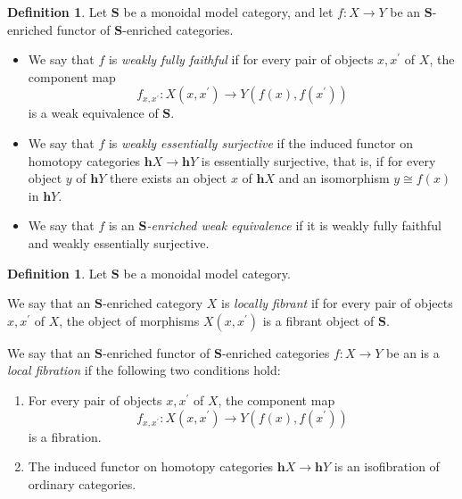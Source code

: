 \documentclass[a4paper]{article}
\numberwithin{equation}{subsection}
\theoremstyle{plain}   %
\theoremstyle{definition}
\newtheorem{defn}[equation]{Definition}
\theoremstyle{remark}
\theoremstyle{plain}
\begin{document}
\begin{defn}
	Let \(\mathbf{S}\) be a monoidal model category, and let \(f:X\to Y\) be an \(\mathbf{S}\)-enriched functor of \(\mathbf{S}\)-enriched categories.  
	
	\begin{itemize}
		\item We say that \(f\) is \emph{weakly fully faithful} if for every pair of objects \(x,x^\prime\) of \(X\), the component map 
		\[
			f_{x,x^\prime}: X(x,x^\prime) \to Y(f(x),f(x^\prime))
		\]
		is a weak equivalence of \(\mathbf{S}\).
		\item We say that \(f\) is \emph{weakly essentially surjective} if the induced functor on homotopy categories \(\mathbf{h}X\to \mathbf{h}Y\) is essentially surjective, that is, if for every object \(y\) of \(\mathbf{h}Y\) there exists an object \(x\) of \(\mathbf{h}X\) and an isomorphism \(y\cong f(x)\) in \(\mathbf{h}Y\).
		\item We say that \(f\) is an \emph{\(\mathbf{S}\)-enriched weak equivalence} if it is weakly fully faithful and weakly essentially surjective.
	\end{itemize}
\end{defn}
\begin{defn}
	Let \(\mathbf{S}\) be a monoidal model category. 

	We say that an \(\mathbf{S}\)-enriched category \(X\) is \emph{locally fibrant} if for every pair of objects \(x,x^\prime\) of \(X\), the object of morphisms \(X(x,x^\prime)\) is a fibrant object of \(\mathbf{S}\).
	
	We say that an \(\mathbf{S}\)-enriched functor of \(\mathbf{S}\)-enriched categories \(f:X\to Y\) be an  is a \emph{local fibration} if the following two conditions hold:
	\begin{enumerate}
		\item  For every pair of objects \(x,x^\prime\) of \(X\), the component map 
		\[
			f_{x,x^\prime}: X(x,x^\prime) \to Y(f(x),f(x^\prime))
		\]
		is a fibration.
		\item The induced functor on homotopy categories \(\mathbf{h}X\to \mathbf{h}Y\) is an isofibration of ordinary categories.
	\end{enumerate}
\end{defn}
\end{document}

